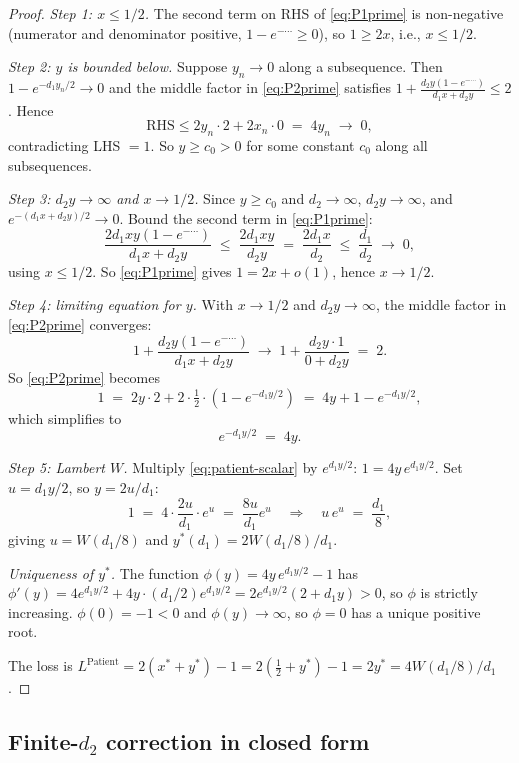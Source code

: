 \documentclass{article}
\theoremstyle{plain}
\theoremstyle{definition}
\begin{document}
\begin{proof}
\emph{Step 1: $x\le 1/2$.} The second term on RHS of \eqref{eq:P1prime} is non-negative (numerator and denominator positive, $1-e^{-\cdots}\ge 0$), so $1\ge 2x$, i.e., $x\le 1/2$.

\emph{Step 2: $y$ is bounded below.} Suppose $y_n\to 0$ along a subsequence. Then $1-e^{-d_1 y_n/2}\to 0$ and the middle factor in \eqref{eq:P2prime} satisfies $1+\frac{d_2 y(1-e^{-\cdots})}{d_1 x+d_2 y}\le 2$. Hence
\[
\text{RHS}\le 2y_n\cdot 2+2x_n\cdot 0\;=\;4y_n\;\to\;0,
\]
contradicting LHS $=1$. So $y\ge c_0>0$ for some constant $c_0$ along all subsequences.

\emph{Step 3: $d_2 y\to\infty$ and $x\to 1/2$.} Since $y\ge c_0$ and $d_2\to\infty$, $d_2 y\to\infty$, and $e^{-(d_1 x+d_2 y)/2}\to 0$. Bound the second term in \eqref{eq:P1prime}:
\[
\frac{2 d_1 xy(1-e^{-\cdots})}{d_1 x+d_2 y}\;\le\;\frac{2 d_1 xy}{d_2 y}\;=\;\frac{2 d_1 x}{d_2}\;\le\;\frac{d_1}{d_2}\;\to\;0,
\]
using $x\le 1/2$. So \eqref{eq:P1prime} gives $1=2x+o(1)$, hence $x\to 1/2$.

\emph{Step 4: limiting equation for $y$.} With $x\to 1/2$ and $d_2 y\to\infty$, the middle factor in \eqref{eq:P2prime} converges:
\[
1+\frac{d_2 y(1-e^{-\cdots})}{d_1 x+d_2 y}\;\to\;1+\frac{d_2 y\cdot 1}{0+d_2 y}\;=\;2.
\]
So \eqref{eq:P2prime} becomes
\[
1\;=\;2y\cdot 2+2\cdot\tfrac12\cdot(1-e^{-d_1 y/2})\;=\;4y+1-e^{-d_1 y/2},
\]
which simplifies to
\begin{equation}\label{eq:patient-scalar}
e^{-d_1 y/2}\;=\;4y.
\end{equation}

\emph{Step 5: Lambert $W$.} Multiply \eqref{eq:patient-scalar} by $e^{d_1 y/2}$: $1=4y\,e^{d_1 y/2}$. Set $u=d_1 y/2$, so $y=2u/d_1$:
\[
1\;=\;4\cdot\frac{2u}{d_1}\cdot e^u\;=\;\frac{8u}{d_1}e^u\quad\Longrightarrow\quad u\,e^u\;=\;\frac{d_1}{8},
\]
giving $u=W(d_1/8)$ and $y^\ast(d_1)=2W(d_1/8)/d_1$.

\emph{Uniqueness of $y^\ast$.} The function $\phi(y)=4y\,e^{d_1 y/2}-1$ has $\phi'(y)=4e^{d_1 y/2}+4y\cdot(d_1/2)e^{d_1 y/2}=2e^{d_1 y/2}(2+d_1 y)>0$, so $\phi$ is strictly increasing. $\phi(0)=-1<0$ and $\phi(y)\to\infty$, so $\phi=0$ has a unique positive root.

The loss is $L^{\text{Patient}}=2(x^\ast+y^\ast)-1=2(\tfrac12+y^\ast)-1=2y^\ast=4W(d_1/8)/d_1$.
\end{proof}

\subsection{Finite-$d_2$ correction in closed form}\label{ssec:patient-correction}
\end{document}
